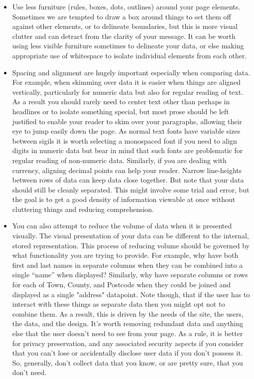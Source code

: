 \begin{itemize}
\item Use less furniture (rules, boxes, dots, outlines) around your page elements. Sometimes we are tempted to draw a box around things to set them off against other elements, or to delineate boundaries, but this is more visual clutter and can detract from the clarity of your message. It can be worth using less visible furniture sometimes to delineate your data, or else making appropriate use of whitespace to isolate individual elements from each other.
\item Spacing and alignment are hugely important especially when comparing data. For example, when skimming over data it is easier when things are aligned vertically, particularly for numeric data but also for regular reading of text. As a result you should rarely need to center text other than perhaps in headlines or to isolate something special, but most prose should be left justified to enable your reader to skim over your paragraphs, allowing their eye to jump easily down the page. As normal text fonts have variable sizes between sigils it is worth selecting a monospaced font if you need to align digits in numeric data but bear in mind that such fonts are problematic for regular reading of non-numeric data. Similarly, if you are dealing with currency, aligning decimal points  can help your reader. Narrow line-heights between rows of data can keep data close together. But note that your data should still be cleanly separated. This might involve some trial and error, but the goal is to get a good density of information viewable at once without cluttering things and reducing comprehension.
\item You can also attempt to reduce the volume of data when it is presented visually. The visual presentation of your data can be different to the internal, stored representation. This process of reducing volume should be governed by what functionality you are trying to provide. For example, why have both first and last names in separate columns when they can be combined into a single “name” when displayed? Similarly, why have separate columns or rows for each of Town, County, and Postcode when they could be joined and displayed as a single "address" datapoint. Note though, that if the user has to interact with these things as separate data then you might opt not to combine them. As a result, this is driven by the needs of the site, the users, the data, and the design. It's worth removing redundant data and anything else that the user doesn’t need to see from your page. As a rule, it is better for privacy preservation, and any associated security aspects if you consider that you can't lose or accidentally disclose user data if you don't possess it. So, generally, don't collect data that you know, or are pretty sure, that you don't need.

\end{itemize}
